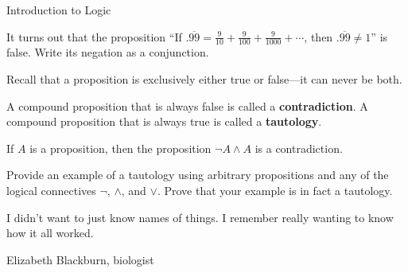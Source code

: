 \begin{section}{Introduction to Logic}
\begin{problem}
It turns out that the proposition ``If $.\overline{99}=\frac{9}{10}+\frac{9}{100}+\frac{9}{1000}+\cdots$, then $.\overline{99}\neq 1$'' is false. Write its  negation as a conjunction.
\end{problem}

Recall that a proposition is exclusively either true or false---it can never be both.

\begin{definition}
A compound proposition that is always false is called a \textbf{contradiction}.  A compound proposition that is always true is called a \textbf{tautology}.
\end{definition}

\begin{theorem}
If $A$ is a proposition, then the proposition $\neg A\wedge A$ is a contradiction.
\end{theorem}

\begin{problem}
Provide an example of a tautology using arbitrary propositions and any of the logical connectives $\neg$, $\wedge$, and $\vee$.  Prove that your example is in fact a tautology.
\end{problem}

\epigraph{I didn't want to just know names of things. I remember really wanting to know how it all worked.}{Elizabeth Blackburn, biologist}

\end{section}
